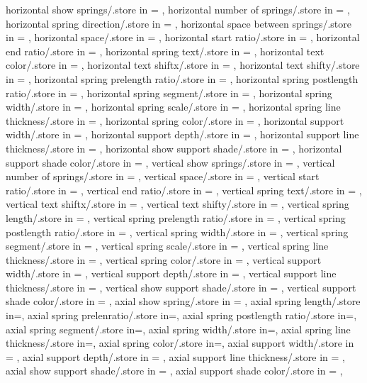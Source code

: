 {  horizontal show springs/.store in = \showhorizontalsprings,
  horizontal number of springs/.store in = \horspringnumber,
  horizontal spring direction/.store in = \horspringdir,
  horizontal space between springs/.store in = \horspbtwspr,
  horizontal space/.store in = \horspringspace,
  horizontal start ratio/.store in = \horspringstartratio,
  horizontal end ratio/.store in = \horspringendratio,
  horizontal spring text/.store in = \horspringtext,
  horizontal text color/.store in = \hortextcolor,
  horizontal text shiftx/.store in = \hortextshiftx,
  horizontal text shifty/.store in = \hortextshifty,
  horizontal spring prelength ratio/.store in = \horprelenratio,
  horizontal spring postlength ratio/.store in = \horpostlenratio,
  horizontal spring segment/.store in = \horsegm,
  horizontal spring width/.store in = \horsprwid,
  horizontal spring scale/.store in = \horsprscale,
  horizontal spring line thickness/.store in = \horsprlinethk,
  horizontal spring color/.store in = \horsprcolor,
  horizontal support width/.store in = \horsuppwidth,
  horizontal support depth/.store in = \horsuppdepth,
  horizontal support line thickness/.store in = \horsupplinethk,
  horizontal show support shade/.store in = \horshowsuppshade,
  horizontal support shade color/.store in = \horsuppshadecol,
  vertical show springs/.store in = \showverticalsprings,
  vertical number of springs/.store in = \verspringnumber,
  vertical space/.store in = \verspringspace,
  vertical start ratio/.store in = \verspringstartratio,
  vertical end ratio/.store in = \verspringendratio,
  vertical spring text/.store in = \verspringtext,
  vertical text shiftx/.store in = \vertextshiftx,
  vertical text shifty/.store in = \vertextshifty,
  vertical spring length/.store in = \verspringlength,
  vertical spring prelength ratio/.store in = \verprelenratio,
  vertical spring postlength ratio/.store in = \verpostlenratio,
  vertical spring width/.store in = \verampl,
  vertical spring segment/.store in = \versegm,
  vertical spring scale/.store in = \verspringscale,
  vertical spring line thickness/.store in = \verspringthk,
  vertical spring color/.store in = \verspringcolor,
  vertical support width/.store in = \versuppwidth,
  vertical support depth/.store in = \versuppdepth,
  vertical support line thickness/.store in = \versupplinethk,
  vertical show support shade/.store in = \vershowsuppshade,
  vertical support shade color/.store in = \versuppshadecol,
  axial show spring/.store in = \showaxialspring,
  axial spring length/.store in=\axialspringlength,
  axial spring prelenratio/.store in=\axialspringprelenratio,
  axial spring postlength ratio/.store in=\axialspringpostlenratio,
  axial spring segment/.store in=\axialspringsegm,
  axial spring width/.store in=\axialspringwidth,
  axial spring line thickness/.store in=\axialspringlinethk,
  axial spring color/.store in=\axialspringcolor,
  axial support width/.store in = \axialsuppwidth,
  axial support depth/.store in = \axialsuppdepth,
  axial support line thickness/.store in = \axialsupplinethk,
  axial show support shade/.store in = \axialshowsuppshade,
  axial support shade color/.store in = \axialsuppshadecol,}

